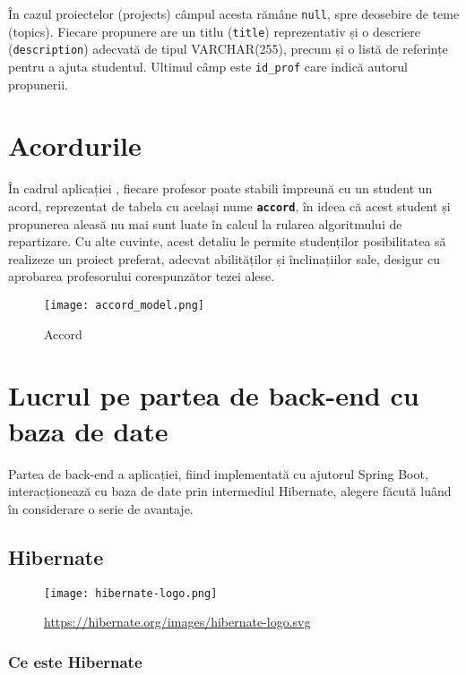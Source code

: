 În cazul proiectelor (projects) câmpul acesta rămâne \texttt{null}, spre deosebire de teme (topics). Fiecare propunere are un titlu (\texttt{title}) reprezentativ și o descriere (\texttt{description}) adecvată de tipul VARCHAR(255), precum și o listă de referințe pentru a ajuta studentul. Ultimul câmp este \texttt{id\_prof} care indică autorul propunerii.


\section{Acordurile}

În cadrul aplicației \thesistitle, fiecare profesor poate stabili împreună cu un student un acord, reprezentat de tabela cu același nume \textbf{\texttt{accord}}, în ideea că acest student și propunerea aleasă nu mai sunt luate în calcul la rularea algoritmului de repartizare. Cu alte cuvinte, acest detaliu le permite studenților posibilitatea să realizeze un proiect preferat, adecvat abilităților și înclinațiilor sale, desigur cu aprobarea profesorului corespunzător tezei alese.

\begin{figure}[H]
	\centering
	\texttt{[image: accord\_model.png]}
	\caption{Accord}
\end{figure}

\section{Lucrul pe partea de back-end cu baza de date}

Partea de back-end a aplicației, fiind implementată cu ajutorul Spring Boot, interacționează cu baza de date prin intermediul Hibernate, alegere făcută luând în considerare o serie de avantaje.

\subsection{Hibernate}

\begin{figure}[H]
	\texttt{[image: hibernate-logo.png]}
	\caption{\url{https://hibernate.org/images/hibernate-logo.svg}}
\end{figure}

\subsubsection{Ce este Hibernate}

